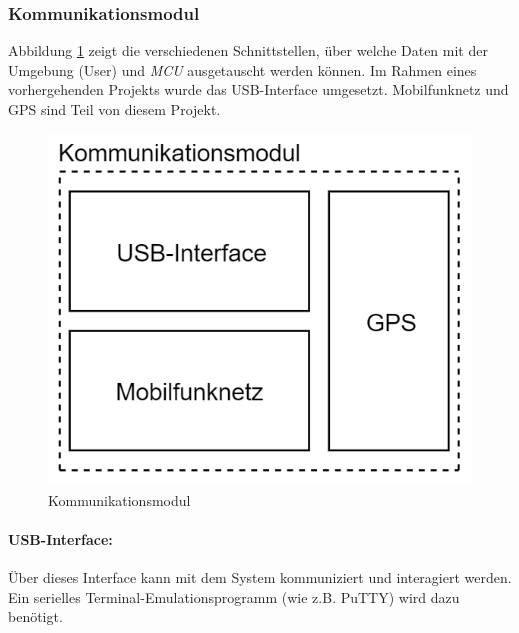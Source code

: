 \subsubsection{Kommunikationsmodul}
Abbildung \ref{fig:kommunikationsmodul} zeigt die verschiedenen Schnittstellen, über welche Daten mit der Umgebung (User) und \textit{MCU} ausgetauscht werden können. Im Rahmen eines vorhergehenden Projekts wurde das USB-Interface umgesetzt. Mobilfunknetz und GPS sind Teil von diesem Projekt.\\
\begin{figure}[h]
\centering
\includegraphics[scale=0.7]{graphics/Konzeptdiagramme/Kommunikationsmodul.PNG}
\caption{Kommunikationsmodul}
\label{fig:kommunikationsmodul}
\end{figure}

\paragraph{USB-Interface:}
Über dieses Interface kann mit dem System kommuniziert und interagiert werden. Ein serielles Terminal-Emulationsprogramm (wie z.B. PuTTY) wird dazu benötigt.\\

